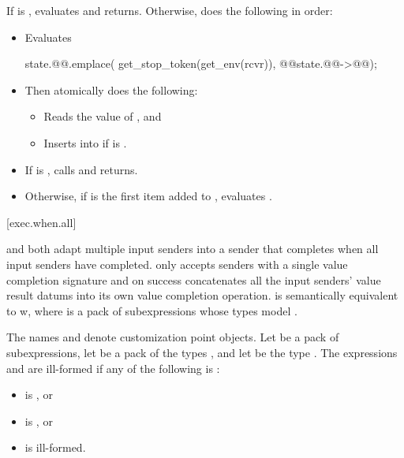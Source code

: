 \effects
If  is ,
evaluates  and returns.
Otherwise, does the following in order:
\begin{itemize}
\item
Evaluates
\begin{codeblock}
state.@@.emplace(
  get_stop_token(get_env(rcvr)),
  @@{state.@@->@@});
\end{codeblock}
\item
Then atomically does the following:
\begin{itemize}
\item
Reads the value  of
, and
\item
Inserts  into
if  is .
\end{itemize}
\item
If  is ,
calls  and returns.
\item
Otherwise,
if  is the first item added to
,
evaluates .
\end{itemize}

[exec.when.all]{}

\pnum
{} and 
both adapt multiple input senders into a sender
that completes when all input senders have completed.
 only accepts senders
with a single value completion signature and
on success concatenates all the input senders' value result datums
into its own value completion operation.
 is semantically equivalent to
w,
where  is a pack of subexpressions
whose types model .

\pnum
The names  and  denote
customization point objects.
Let  be a pack of subexpressions,
let  be a pack of the types , and
let  be
the type .
The expressions  and
 are ill-formed
if any of the following is :
\begin{itemize}
\item
{} is , or
\item
{} is , or
\item
{} is ill-formed.
\end{itemize}

